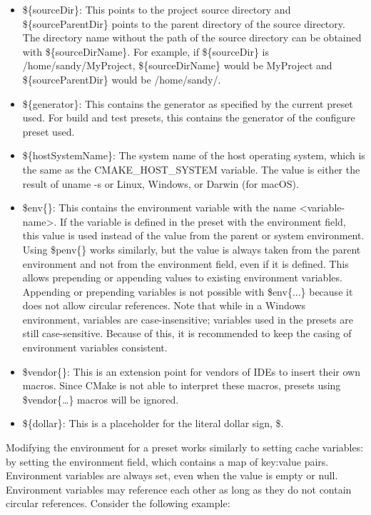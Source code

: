 \begin{itemize}
\item 
\$\{sourceDir\}: This points to the project source directory and \$\{sourceParentDir\} points to the parent directory of the source directory. The directory name without the path of the source directory can be obtained with \$\{sourceDirName\}. For example, if \$\{sourceDir\} is /home/sandy/MyProject, \$\{sourceDirName\} would be MyProject and \$\{sourceParentDir\} would be /home/sandy/.

\item 
\$\{generator\}: This contains the generator as specified by the current preset used. For build and test presets, this contains the generator of the configure preset used.

\item 
\$\{hostSystemName\}: The system name of the host operating system, which is the same as the CMAKE\_HOST\_SYSTEM variable. The value is either the result of uname -s or Linux, Windows, or Darwin (for macOS).

\item
\$env\{<variable-name>\}: This contains the environment variable with the name <variable-name>. If the variable is defined in the preset with the environment field, this value is used instead of the value from the parent or system environment. Using \$penv\{<variable-name>\} works similarly, but the value is always taken from the parent environment and not from the environment field, even if it is defined. This allows prepending or appending values to existing environment variables. Appending or prepending variables is not possible with \$env\{...\} because it does not allow circular references. Note that while in a Windows environment, variables are case-insensitive; variables used in the presets are still case-sensitive. Because of this, it is recommended to keep the casing of environment variables consistent.

\item
\$vendor\{<macro-name>\}: This is an extension point for vendors of IDEs to
insert their own macros. Since CMake is not able to interpret these macros, presets
using \$vendor\{…\} macros will be ignored.

\item
\$\{dollar\}: This is a placeholder for the literal dollar sign, \$.
\end{itemize}

Modifying the environment for a preset works similarly to setting cache variables: by setting the environment field, which contains a map of key:value pairs. Environment variables are always set, even when the value is empty or null. Environment variables may reference each other as long as they do not contain circular references. Consider the following example:

